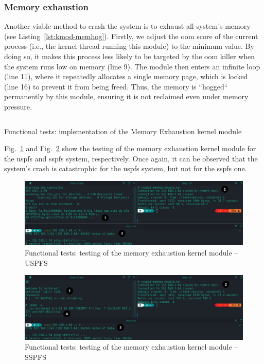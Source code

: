 \subsubsection{Memory exhaustion}
\label{sec:mem-exhaustion}
Another viable method to crash the system is to exhaust all system's memory (see
Listing~\ref{lst:kmod-memhog}). Firstly, we adjust the \gls{oom} score of the
current process (i.e., the kernel thread running this module) to the minimum
value. By doing so, it makes this process less likely to be targeted by the
\gls{oom} killer when the system runs low on memory (line 9). The module then
enters an infinite loop (line 11), where it repeatedly allocates a single memory
page, which is locked (line 16) to prevent it from being freed. Thus, the memory
is ``hogged`` permanently by this module, ensuring it is not reclaimed even
under memory pressure.

\begin{longlisting}
\centering
\inputminted[]{c}{./listing/kmod_memhog.c}
\caption{Functional tests: implementation of the Memory Exhaustion kernel module}
\label{lst:kmod-memhog}
\end{longlisting}

Fig.~\ref{fig:kmod-memhog-test} and Fig.~\ref{fig:kmod-memhog-test-bao} show the
testing of the memory exhaustion kernel module for the \gls{uspfs} and
\gls{sspfs} system, respectively. Once again, it can be observed that the
system's crash is catastrophic for the \gls{uspfs} system, but not for the
\gls{sspfs} one.

\begin{figure}[!hbt]
  \centering
  \includegraphics[width=1.0\textwidth]{./img/png/kmod-memhog-test-annot} 
  \caption{Functional tests: testing of the memory exhaustion kernel module -- USPFS}%
  \label{fig:kmod-memhog-test}
\end{figure}

\begin{figure}[!hbt]
  \centering
  \includegraphics[width=1.0\textwidth]{./img/png/kmod-memhog-test-bao-annot} 
  \caption{Functional tests: testing of the memory exhaustion kernel module -- SSPFS}%
  \label{fig:kmod-memhog-test-bao}
\end{figure}


